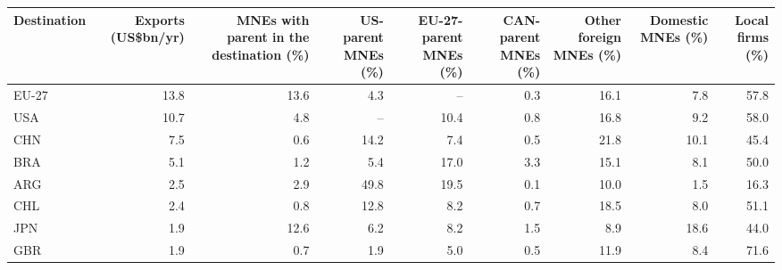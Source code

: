 \begin{tabular}{lrrrrrrrr}
\toprule
Destination & \multicolumn{1}{p{1.5cm}}{\raggedright Exports (US\$bn/yr)} & \multicolumn{1}{p{2.2cm}}{\raggedright MNEs with parent in the destination (\%)} & \multicolumn{1}{p{1.6cm}}{\raggedright US-parent MNEs (\%)} & \multicolumn{1}{p{1.6cm}}{\raggedright EU-27-parent MNEs (\%)} & \multicolumn{1}{p{1.6cm}}{\raggedright CAN-parent MNEs (\%)} & \multicolumn{1}{p{1.6cm}}{\raggedright Other foreign MNEs (\%)} & \multicolumn{1}{p{1.6cm}}{\raggedright Domestic MNEs (\%)} & \multicolumn{1}{p{1.5cm}}{\raggedright Local firms (\%)} \\
\midrule
EU-27 & 13.8 & 13.6 & 4.3 & -- & 0.3 & 16.1 & 7.8 & 57.8 \\
USA & 10.7 & 4.8 & -- & 10.4 & 0.8 & 16.8 & 9.2 & 58.0 \\
CHN & 7.5 & 0.6 & 14.2 & 7.4 & 0.5 & 21.8 & 10.1 & 45.4 \\
BRA & 5.1 & 1.2 & 5.4 & 17.0 & 3.3 & 15.1 & 8.1 & 50.0 \\
ARG & 2.5 & 2.9 & 49.8 & 19.5 & 0.1 & 10.0 & 1.5 & 16.3 \\
CHL & 2.4 & 0.8 & 12.8 & 8.2 & 0.7 & 18.5 & 8.0 & 51.1 \\
JPN & 1.9 & 12.6 & 6.2 & 8.2 & 1.5 & 8.9 & 18.6 & 44.0 \\
GBR & 1.9 & 0.7 & 1.9 & 5.0 & 0.5 & 11.9 & 8.4 & 71.6 \\
\bottomrule
\end{tabular}
